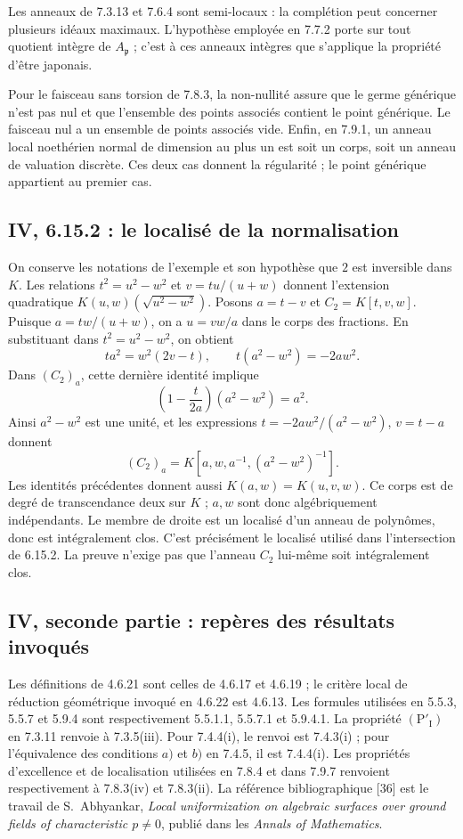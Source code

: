 Les anneaux de 7.3.13 et 7.6.4 sont semi-locaux : la complétion peut
concerner plusieurs idéaux maximaux. L'hypothèse employée en 7.7.2 porte
sur tout quotient intègre de $A_{\mathfrak p}$ ; c'est à ces anneaux
intègres que s'applique la propriété d'être japonais.

Pour le faisceau sans torsion de 7.8.3, la non-nullité assure que le
germe générique n'est pas nul et que l'ensemble des points associés
contient le point générique. Le faisceau nul a un ensemble de points
associés vide. Enfin, en 7.9.1, un anneau local noethérien normal de
dimension au plus un est soit un corps, soit un anneau de valuation
discrète. Ces deux cas donnent la régularité ; le point générique
appartient au premier cas.

\subsection{IV, 6.15.2 : le localisé de la normalisation}
\label{note:iv2-normalization}
On conserve les notations de l'exemple et son hypothèse que $2$ est
inversible dans $K$. Les relations $t^2=u^2-w^2$ et $v=tu/(u+w)$
donnent l'extension quadratique $K(u,w)(\sqrt{u^2-w^2})$.
Posons $a=t-v$ et $C_2=K[t,v,w]$. Puisque $a=tw/(u+w)$,
on a $u=vw/a$ dans le corps des fractions. En substituant dans
$t^2=u^2-w^2$, on obtient
\[
 t a^2=w^2(2v-t),\qquad t(a^2-w^2)=-2aw^2.
\]
Dans $(C_2)_a$, cette dernière identité implique
\[
 \left(1-\frac{t}{2a}\right)(a^2-w^2)=a^2.
\]
Ainsi $a^2-w^2$ est une unité, et les expressions
$t=-2aw^2/(a^2-w^2)$, $v=t-a$ donnent
\[
 (C_2)_a=K[a,w,a^{-1},(a^2-w^2)^{-1}].
\]
Les identités précédentes donnent aussi $K(a,w)=K(u,v,w)$.
Ce corps est de degré de transcendance deux sur $K$ ; $a,w$ sont donc
algébriquement indépendants. Le membre de droite est un localisé d'un
anneau de polynômes, donc est intégralement clos. C'est précisément le
localisé utilisé dans l'intersection de 6.15.2. La preuve n'exige pas
que l'anneau $C_2$ lui-même soit intégralement clos.

\subsection{IV, seconde partie : repères des résultats invoqués}
\label{note:iv2-refs}
Les définitions de 4.6.21 sont celles de 4.6.17 et 4.6.19 ; le critère
local de réduction géométrique invoqué en 4.6.22 est 4.6.13.
Les formules utilisées en 5.5.3, 5.5.7 et 5.9.4 sont respectivement
5.5.1.1, 5.5.7.1 et 5.9.4.1.
La propriété $(\mathrm P'_{\mathrm I})$ en 7.3.11 renvoie à 7.3.5(iii).
Pour 7.4.4(i), le renvoi est 7.4.3(i) ; pour l'équivalence des conditions
$a)$ et $b)$ en 7.4.5, il est 7.4.4(i).
Les propriétés d'excellence et de localisation utilisées en 7.8.4 et dans 7.9.7 renvoient respectivement à 7.8.3(iv) et 7.8.3(ii).
La référence bibliographique [36] est le travail de S.~Abhyankar,
\emph{Local uniformization on algebraic surfaces over ground fields of
characteristic $p\ne0$}, publié dans les \emph{Annals of Mathematics}.
\par
